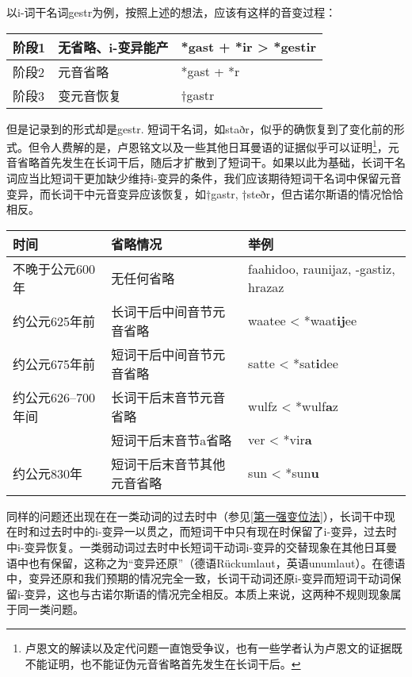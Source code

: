 {{以i-词干名词gestr为例，按照上述的想法，应该有这样的音变过程：

\begin{longtable}{lll}
  \toprule
  阶段1 & 无省略、i-变异能产 & *gast + *ir \textgreater{} *gestir \\
  \midrule
  \endhead
  \bottomrule
  \endfoot
  阶段2 & 元音省略       & *gast + *r                         \\
  阶段3 & 变元音恢复      & †gastr                             \\
\end{longtable}

但是记录到的形式却是gestr.
短词干名词，如staðr，似乎的确恢复到了变化前的形式。但令人费解的是，卢恩铭文以及一些其他日耳曼语的证据似乎可以证明\footnote{卢恩文的解读以及定代问题一直饱受争议，也有一些学者认为卢恩文的证据既不能证明，也不能证伪元音省略首先发生在长词干后。}，元音省略首先发生在长词干后，随后才扩散到了短词干。如果以此为基础，长词干名词应当比短词干更加缺少维持i-变异的条件，我们应该期待短词干名词中保留元音变异，而长词干中元音变异应该恢复，如†gastr,
†steðr，但古诺尔斯语的情况恰恰相反。

\begin{longtable}{lll}
  \toprule
  时间            & 省略情况          & 举例                                  \\
  \midrule
  \endhead
  \bottomrule
  \endfoot
  不晚于公元600年     & 无任何省略         & faahidoo, raunijaz, -gastiz, hrazaz \\
  约公元625年前      & 长词干后中间音节元音省略  & waatee \textless{}
  *waat\textbf{ij}ee                                                  \\
  约公元675年前      & 短词干后中间音节元音省略  & satte \textless{}
  *sat\textbf{i}dee                                                   \\
  约公元626--700年间 & 长词干后末音节元音省略   & wulfz \textless{}
  *wulf\textbf{a}z                                                    \\
                & 短词干后末音节a省略    & ver \textless{} *vir\textbf{a}      \\
  约公元830年       & 短词干后末音节其他元音省略 & sun \textless{}
  *sun\textbf{u}                                                      \\
\end{longtable}

同样的问题还出现在在一类动词的过去时中（参见\ref{第一强变位法}），长词干中现在时和过去时中的i-变异一以贯之，而短词干中只有现在时保留了i-变异，过去时中i-变异恢复。一类弱动词过去时中长短词干动词i-变异的交替现象在其他日耳曼语中也有保留，这称之为``变异还原''（德语Rückumlaut，英语unumlaut）。在德语中，变异还原和我们预期的情况完全一致，长词干动词还原i-变异而短词干动词保留i-变异，这也与古诺尔斯语的情况完全相反。本质上来说，这两种不规则现象属于同一类问题。

}}
